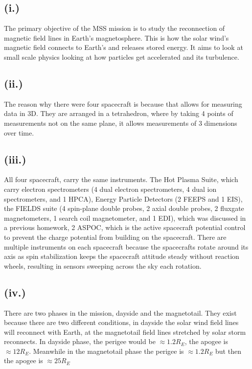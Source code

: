 \documentclass[11pt]{article}
\begin{document}
\subsection*{(i.)}
\hspace*{2em}The primary objective of the MSS mission is to study the reconnection of magnetic field lines in Earth's magnetosphere. This is how the solar wind's magnetic field connects to Earth's and releases stored energy. It aims to look at small scale physics looking at how particles get accelerated and its turbulence. 
\subsection*{(ii.)}
\hspace*{2em}The reason why there were four spacecraft is because that allows for measuring data in 3D. They are arranged in a tetrahedron, where by taking 4 points of measurements not on the same plane, it allows measurements of 3 dimensions over time. 
\subsection*{(iii.)}
\hspace*{2em}All four spacecraft, carry the same instruments. The Hot Plasma Suite, which carry electron spectrometers (4 dual electron spectrometers, 4 dual ion spectrometers, and 1 HPCA), Energy Particle Detectors (2 FEEPS and 1 EIS), the FIELDS suite (4 spin-plane double probes, 2 axial double probes, 2 fluxgate magnetometers, 1 search coil magnetometer, and 1 EDI), which was discussed in a previous homework, 2 ASPOC, which is the active spacecraft potential control to prevent the charge potential from building on the spacecraft. There are multiple instruments on each spacecraft because the spacecrafts rotate around its axis as spin stabilization keeps the spacecraft attitude steady without reaction wheels, resulting in sensors sweeping across the sky each rotation.

\subsection*{(iv.)}
\hspace*{2em}There are two phases in the mission, dayside and the magnetotail. They exist because there are two different conditions, in dayside the solar wind field lines will reconnect with Earth, at the magnetotail field lines stretched by solar storm reconnects. In dayside phase, the perigee would be $\approx 1.2 R_E$, the apogee is $\approx 12 R_E$. Meanwhile in the magnetotail phase the perigee is $\approx1.2 R_E$ but then the apogee is $\approx25 R_E$
\end{document}

